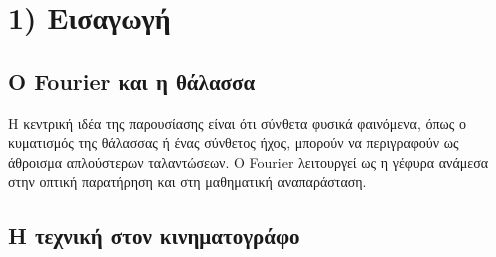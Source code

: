 \documentclass[a4paper, 11pt]{article}
\begin{document}


\begin{abstract}
Η παρουσίαση διερευνά πώς η θεωρία Fourier συνδέει τον ήχο, τα κύματα και τη σύγχρονη ψηφιακή προσομοίωση της θάλασσας. Αφετηρία αποτελούν παραδείγματα από τον κινηματογράφο και τα βιντεοπαιχνίδια, όπου οι επιφάνειες νερού δεν σχεδιάζονται κύμα-κύμα, αλλά προκύπτουν από φασματικά μοντέλα και αποδοτικούς αλγορίθμους.
Μέσα από αυτή τη διαδρομή, η θεωρία δεν παρουσιάζεται ως έτοιμο εργαλείο, αλλά αναδύεται φυσικά: από τα απλά κύματα και τη σύνθεση ήχων, στις μιγαδικές περιστροφές, τις αναπτύξεις Taylor και τον τύπο του Euler, μέχρι τους μετασχηματισμούς Fourier και την υπολογιστική τους υλοποίηση.
Η βασική ιδέα είναι ότι κάθε πολύπλοκο φαινόμενο μπορεί να αποσυντεθεί σε απλές ταλαντώσεις και να ανακατασκευαστεί από αυτές. Με αυτό το πρίσμα, παρουσιάζεται ένα πλήρες pipeline για ocean rendering: επιλογή ενεργειακού φάσματος, εισαγωγή τυχαίων φάσεων, εξέλιξη στο πεδίο συχνοτήτων και τελική ανακατασκευή της επιφάνειας μέσω IFFT.

Στο τέλος, η ψηφιακή θάλασσα δεν αποτελεί απλώς ένα οπτικό αποτέλεσμα, αλλά μια κατασκευή της οποίας μπορούμε να αναγνωρίσουμε τη δομή και την προέλευση κάθε κύματος.
\end{abstract}

\section{1) Εισαγωγή}\label{ux3b5ux3b9ux3c3ux3b1ux3b3ux3c9ux3b3ux3ae}

\subsection{Ο Fourier και η
θάλασσα}\label{ux3bf-fourier-ux3baux3b1ux3b9-ux3b7-ux3b8ux3acux3bbux3b1ux3c3ux3c3ux3b1}

Η κεντρική ιδέα της παρουσίασης είναι ότι σύνθετα φυσικά φαινόμενα, όπως
ο κυματισμός της θάλασσας ή ένας σύνθετος ήχος, μπορούν να περιγραφούν
ως άθροισμα απλούστερων ταλαντώσεων. Ο Fourier λειτουργεί ως η γέφυρα
ανάμεσα στην οπτική παρατήρηση και στη μαθηματική αναπαράσταση.

\subsection{Η τεχνική στον
κινηματογράφο}\label{ux3b7-ux3c4ux3b5ux3c7ux3bdux3b9ux3baux3ae-ux3c3ux3c4ux3bfux3bd-ux3baux3b9ux3bdux3b7ux3bcux3b1ux3c4ux3bfux3b3ux3c1ux3acux3c6ux3bf}
\end{document}
